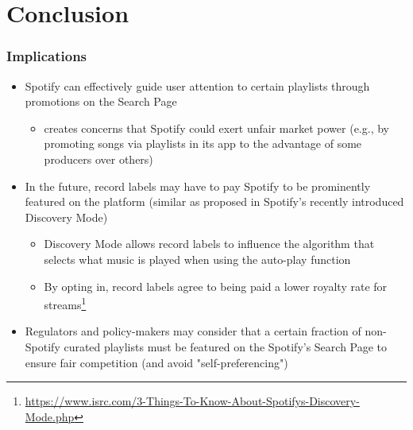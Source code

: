 \documentclass[8pt]{beamer}
\begin{document}

\section{Conclusion}



\begin{frame}[label=shortversion]

\frametitle{Implications}

	\begin{itemize}
		\item[(1)] Spotify can effectively guide user attention to certain playlists through promotions on the Search Page
        \begin{itemize}
            \item[$\rightarrow$] creates concerns that Spotify could exert unfair market power (e.g., by promoting songs via playlists in its app to the advantage of some producers over others)
        \end{itemize}
        \item[(3)] In the future, record labels may have to pay Spotify to be prominently featured on the platform (similar as proposed in Spotify's recently introduced Discovery Mode)
		\begin{itemize}
		    \item[$\rightarrow$] Discovery Mode allows  record labels to influence the algorithm that selects what music is played when using the auto-play  function
		    \item[$\rightarrow$] By opting in, record labels agree to being paid a lower royalty rate for streams\footnote{\url{https://www.isrc.com/3-Things-To-Know-About-Spotifys-Discovery-Mode.php}}
		\end{itemize}
        \item[(4)] Regulators and policy-makers may consider that a certain fraction of non-Spotify curated playlists must be featured on the Spotify's Search Page to ensure fair competition (and avoid "self-preferencing")
	\end{itemize}

\end{frame}
\end{document}

